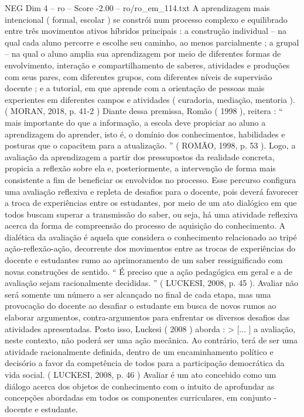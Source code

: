 \begin{textsample}{NEG Dim 4 – ro – Score -2.00 – ro/ro\_em\_114.txt}
A aprendizagem mais intencional ( formal, escolar ) se constrói num processo complexo e equilibrado entre três movimentos ativos híbridos principais : a construção individual – na qual cada aluno percorre e escolhe seu caminho, ao menos parcialmente ; a grupal – na qual o aluno amplia sua aprendizagem por meio de diferentes formas de envolvimento, interação e compartilhamento de saberes, atividades e produções com seus pares, com diferentes grupos, com diferentes níveis de supervisão docente ; e a tutorial, em que aprende com a orientação de pessoas mais experientes em diferentes campos e atividades ( curadoria, mediação, mentoria ). ( MORAN, 2018, p. 41-2 ) Diante dessa premissa, Romão ( 1998 ), reitera : “ mais importante do que a informação, a escola deve propiciar ao aluno a aprendizagem do aprender, isto é, o domínio dos conhecimentos, habilidades e posturas que o capacitem para a atualização. ” ( ROMÃO, 1998, p. 53 ).
Logo, a avaliação da aprendizagem a partir dos pressupostos da realidade concreta, propicia a reflexão sobre ela e, posteriormente, a intervenção de forma mais consistente a fim de beneficiar os envolvidos no processo.
Esse percurso configura uma avaliação reflexiva e repleta de desafios para o docente, pois deverá favorecer a troca de experiências entre os estudantes, por meio de um ato dialógico em que todos buscam superar a transmissão do saber, ou seja, há uma atividade reflexiva acerca da forma de compreensão do processo de aquisição do conhecimento.
A dialética da avaliação é aquela que considera o conhecimento relacionado ao tripé ação-reflexão-ação, decorrente dos movimentos entre as trocas de experiências do docente e estudantes rumo ao aprimoramento de um saber ressignificado com novas construções de sentido. “ É preciso que a ação pedagógica em geral e a de avaliação sejam racionalmente decididas. ” ( LUCKESI, 2008, p. 45 ).
Avaliar não será somente um número a ser alcançado no final de cada etapa, mas uma provocação do docente ao desafiar o estudante em busca de novos rumos ao elaborar argumentos, contra-argumentos para enfrentar os diversos desafios das atividades apresentadas.
Posto isso, Luckesi ( 2008 ) aborda : > [... ] a avaliação, neste contexto, não poderá ser uma ação mecânica.
Ao contrário, terá de ser uma atividade racionalmente definida, dentro de um encaminhamento político e decisório a favor da competência de todos para a participação democrática da vida social. ( LUCKESI, 2008, p. 46 ) Avaliar é um ato concebido como um diálogo acerca dos objetos de conhecimento com o intuito de aprofundar as concepções abordadas em todos os componentes curriculares, em conjunto - docente e estudante.

\end{textsample}
